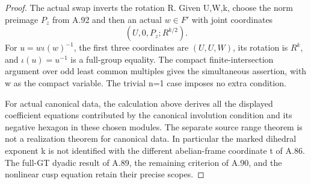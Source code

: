 \begin{proof}
The actual swap inverts the rotation R. Given U,W,k, choose
the norm preimage \(P_z\) from A.92 and then an actual
\(w\in F'\) with joint coordinates
\[
                  (U,0,P_z;R^{k/2}).
\]
For \(u=w\iota(w)^{-1}\), the first three coordinates are
\((U,U,W)\), its rotation is \(R^k\), and
\(\iota(u)=u^{-1}\) is a full-group equality. The compact
finite-intersection argument over odd least common multiples
gives the simultaneous assertion, with w as the compact
variable. The trivial n=1 case imposes no extra condition.

For actual canonical data, the calculation above derives all
the displayed coefficient equations contributed by the
canonical involution condition and its negative hexagon in
these chosen modules. The separate source range theorem is
not a realization theorem for canonical data. In particular
the marked dihedral exponent k is not identified with the
different abelian-frame coordinate t of A.86. The full-GT
dyadic result of A.89, the remaining criterion of A.90, and
the nonlinear cusp equation retain their precise scopes.
\end{proof}
